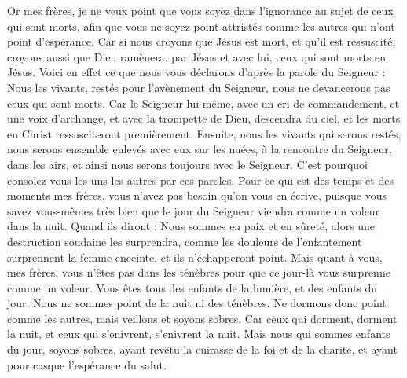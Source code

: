 \begin{multicols}{2}
Or mes frères, je ne veux point que vous soyez dans l’ignorance au sujet de ceux qui sont morts, afin que vous ne soyez point attristés comme les autres qui n'ont point d'espérance.
Car si nous croyons que Jésus est mort, et qu'il est ressuscité, croyons aussi que Dieu ramènera, par Jésus et avec lui, ceux qui sont morts en Jésus.
Voici en effet ce que nous vous déclarons d’après la parole du Seigneur : Nous les vivants, restés pour l’avènement du Seigneur, nous ne devancerons pas ceux qui sont morts.
Car le Seigneur lui-même, avec un cri de commandement, et une voix d'archange, et avec la trompette de Dieu, descendra du ciel, et les morts en Christ ressusciteront premièrement.
Ensuite, nous les vivants qui serons restés, nous serons ensemble enlevés avec eux sur les nuées, à la rencontre du Seigneur, dans les airs, et ainsi nous serons toujours avec le Seigneur.
C'est pourquoi consolez-vous les uns les autres par ces paroles.
\VerseOne{}Pour ce qui est des temps et des moments mes frères, vous n'avez pas besoin qu'on vous en écrive,
puisque vous savez vous-mêmes très bien que le jour du Seigneur viendra comme un voleur dans la nuit.
Quand ils diront : Nous sommes en paix et en sûreté, alors une destruction soudaine les surprendra, comme les douleurs de l’enfantement surprennent la femme enceinte, et ils n’échapperont point.
Mais quant à vous, mes frères, vous n'êtes pas dans les ténèbres pour que ce jour-là vous surprenne comme un voleur.
Vous êtes tous des enfants de la lumière, et des enfants du jour. Nous ne sommes point de la nuit ni des ténèbres.
Ne dormons donc point comme les autres, mais veillons et soyons sobres.
Car ceux qui dorment, dorment la nuit, et ceux qui s'enivrent, s'enivrent la nuit.
Mais nous qui sommes enfants du jour, soyons sobres, ayant revêtu la cuirasse de la foi et de la charité, et ayant pour casque l'espérance du salut.

\end{multicols}

